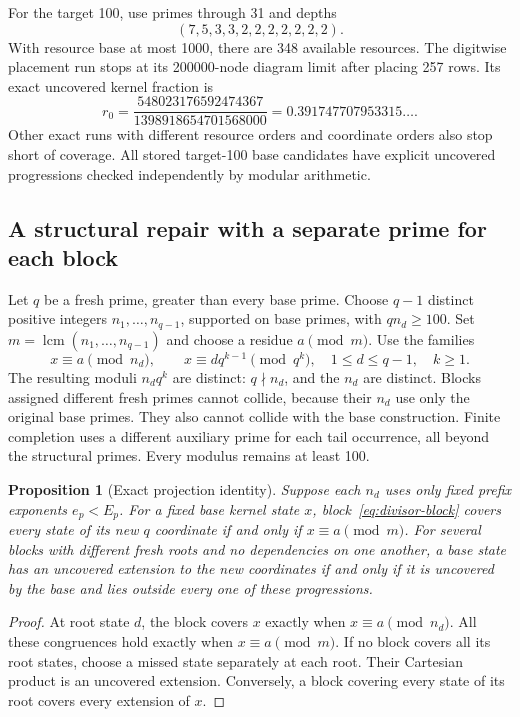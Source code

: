 \documentclass[11pt]{article}
\newtheorem{proposition}{Proposition}
\begin{document}
For the target 100, use primes through 31 and depths
\[
 (7,5,3,3,2,2,2,2,2,2,2).
\]
With resource base at most 1000, there are 348 available resources.
The digitwise placement run stops at its 200000-node diagram limit after
placing 257 rows. Its exact uncovered kernel fraction is
\[
 r_0=\frac{548023176592474367}{1398918654701568000}
     =0.391747707953315\ldots.
\]
Other exact runs with different resource orders and coordinate orders also
stop short of coverage. All stored target-100 base candidates have explicit
uncovered progressions checked independently by modular arithmetic.

\subsection{A structural repair with a separate prime for each block}
Let $q$ be a fresh prime, greater than every base prime. Choose $q-1$
distinct positive integers $n_1,\ldots,n_{q-1}$, supported on base primes,
with $qn_d\ge100$. Set $m=\operatorname{lcm}(n_1,\ldots,n_{q-1})$ and
choose a residue $a\pmod m$. Use the families
\begin{equation}\label{eq:divisor-block}
 x\equiv a\pmod {n_d},\qquad
 x\equiv d q^{k-1}\pmod {q^k},
 \quad 1\le d\le q-1,\quad k\ge1.
\end{equation}
The resulting moduli $n_dq^k$ are distinct: $q\nmid n_d$, and the $n_d$
are distinct. Blocks assigned different fresh primes cannot collide,
because their $n_d$ use only the original base primes. They also cannot
collide with the base construction. Finite completion uses a different
auxiliary prime for each tail occurrence, all beyond the structural primes.
Every modulus remains at least 100.

\begin{proposition}[Exact projection identity]
Suppose each $n_d$ uses only fixed prefix exponents $e_p<E_p$. For a
fixed base kernel state $x$, block~\eqref{eq:divisor-block} covers every
state of its new $q$ coordinate if and only if $x\equiv a\pmod m$.
For several blocks with different fresh roots and no dependencies on one
another, a base state has an uncovered extension to the new coordinates
if and only if it is uncovered by the base and lies outside every one of
these progressions.
\end{proposition}
\begin{proof}
At root state $d$, the block covers $x$ exactly when $x\equiv a\pmod{n_d}$.
All these congruences hold exactly when $x\equiv a\pmod m$. If no block
covers all its root states, choose a missed state separately at each root.
Their Cartesian product is an uncovered extension. Conversely, a block
covering every state of its root covers every extension of $x$.
\end{proof}
\end{document}
